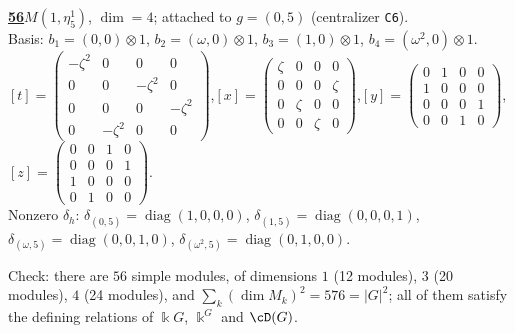 \begin{samepage}\noindent\textbf{\underline{56}}\quad $M(1,\eta^{1}_{5})$, $\dim=4$; attached to $g=(0,5)$ (centralizer \texttt{C6}).\\
Basis: $b_{1}=(0,0)\otimes 1$, $b_{2}=(\omega,0)\otimes 1$, $b_{3}=(1,0)\otimes 1$, $b_{4}=(\omega^2,0)\otimes 1$.\\
$[t]=\left(\begin{smallmatrix} -\zeta^2 & 0 & 0 & 0 \\ 0 & 0 & -\zeta^2 & 0 \\ 0 & 0 & 0 & -\zeta^2 \\ 0 & -\zeta^2 & 0 & 0 \end{smallmatrix}\right)$,\quad $[x]=\left(\begin{smallmatrix} \zeta & 0 & 0 & 0 \\ 0 & 0 & 0 & \zeta \\ 0 & \zeta & 0 & 0 \\ 0 & 0 & \zeta & 0 \end{smallmatrix}\right)$,\quad $[y]=\left(\begin{smallmatrix} 0 & 1 & 0 & 0 \\ 1 & 0 & 0 & 0 \\ 0 & 0 & 0 & 1 \\ 0 & 0 & 1 & 0 \end{smallmatrix}\right)$,\quad $[z]=\left(\begin{smallmatrix} 0 & 0 & 1 & 0 \\ 0 & 0 & 0 & 1 \\ 1 & 0 & 0 & 0 \\ 0 & 1 & 0 & 0 \end{smallmatrix}\right)$.\\
Nonzero $\delta_h$: $\delta_{(0,5)}=\operatorname{diag}(1,0,0,0)$, $\delta_{(1,5)}=\operatorname{diag}(0,0,0,1)$, $\delta_{(\omega,5)}=\operatorname{diag}(0,0,1,0)$, $\delta_{(\omega^2,5)}=\operatorname{diag}(0,1,0,0)$.\end{samepage}
\medskip

\noindent Check: there are $56$ simple modules, of dimensions $1$ (12 modules), $3$ (20 modules), $4$ (24 modules), and $\sum_k(\dim M_k)^2=576=|G|^2$; all of them satisfy the defining relations of $\Bbbk G$, $\Bbbk^G$ and $\cD(G)$.
